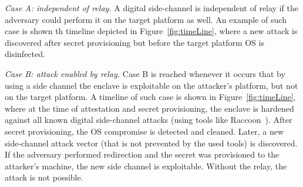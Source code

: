 \begin{mylist}
    \item[\emph{Case A: independent of relay.}] A digital side-channel is independent of relay if the adversary could perform it on the target platform as well. An example of such case is shown th timeline depicted in Figure~\ref{fig:timeLine}, where a new attack is discovered after secret provisioning but before the target platform OS is disinfected.
    

    \item[\emph{Case B: attack enabled by relay.}] Case B is reached whenever it occurs that by using a side channel the enclave is exploitable on the attacker's platform, but not on the target platform. 
    A timeline of such case is shown in Figure~\ref{fig:timeLine}, where at the time of attestation and secret provisioning, the enclave is hardened against all known digital side-channel attacks (using tools like Raccoon~\cite{raccoon}). After secret provisioning, the OS compromise is detected and cleaned. Later, a new side-channel attack vector (that is not prevented by the used tools) is discovered. If the adversary performed redirection and the secret was provisioned to the attacker's machine, the new side channel is exploitable. Without the relay, the attack is not possible.
    
\end{mylist}